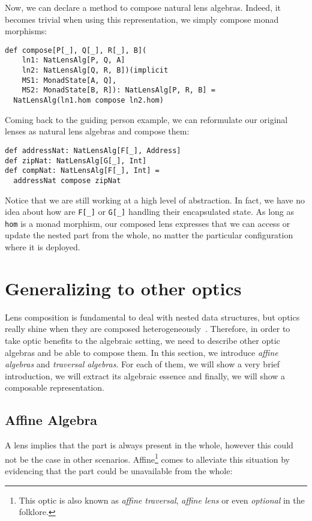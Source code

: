 \documentclass[final, twocolumn, 3p]{elsarticle}
\begin{document}
Now, we can declare a method to compose natural lens algebras. Indeed, it
becomes trivial when using this representation, we simply compose monad
morphisms:

\begin{lstlisting}
def compose[P[_], Q[_], R[_], B](
    ln1: NatLensAlg[P, Q, A]
    ln2: NatLensAlg[Q, R, B])(implicit
    MS1: MonadState[A, Q],
    MS2: MonadState[B, R]): NatLensAlg[P, R, B] =
  NatLensAlg(ln1.hom compose ln2.hom)
\end{lstlisting}

Coming back to the guiding person example, we can reformulate our original
lenses as natural lens algebras and compose them:

\begin{lstlisting}
def addressNat: NatLensAlg[F[_], Address]
def zipNat: NatLensAlg[G[_], Int]
def compNat: NatLensAlg[F[_], Int] =
  addressNat compose zipNat
\end{lstlisting}

Notice that we are still working at a high level of abstraction. In fact, we
have no idea about how are \lstinline{F[_]} or \lstinline{G[_]} handling their
encapsulated state. As long as \lstinline{hom} is a monad morphism, our composed
lens expresses that we can access or update the nested part from the whole, no
matter the particular configuration where it is deployed.

\section{Generalizing to other optics}
\label{sec:Generalizing}

Lens composition is fundamental to deal with nested data structures, but optics
really shine when they are composed
heterogeneously~\cite{pickering2017profunctor}. Therefore, in order to take
optic benefits to the algebraic setting, we need to describe other optic
algebras and be able to compose them. In this section, we introduce \emph{affine
algebras} and \emph{traversal algebras}. For each of them, we will show a very
brief introduction, we will extract its algebraic essence and finally, we will
show a composable representation.

\subsection{Affine Algebra}

A lens implies that the part is always present in the whole, however this could
not be the case in other scenarios. Affine\footnote{This optic is also known as
\emph{affine traversal}, \emph{affine lens} or even \emph{optional} in the
folklore.} comes to alleviate this situation by evidencing that the part could
be unavailable from the whole:
\end{document}
